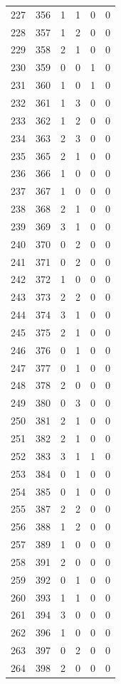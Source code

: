 \documentclass[
  letterpaper,
  DIV=11,
  numbers=noendperiod]{scrreprt}
\begin{document}
\begin{longtable}[]{@{}rrrrrr@{}}
227 & 356 & 1 & 1 & 0 & 0 \\
228 & 357 & 1 & 2 & 0 & 0 \\
229 & 358 & 2 & 1 & 0 & 0 \\
230 & 359 & 0 & 0 & 1 & 0 \\
231 & 360 & 1 & 0 & 1 & 0 \\
232 & 361 & 1 & 3 & 0 & 0 \\
233 & 362 & 1 & 2 & 0 & 0 \\
234 & 363 & 2 & 3 & 0 & 0 \\
235 & 365 & 2 & 1 & 0 & 0 \\
236 & 366 & 1 & 0 & 0 & 0 \\
237 & 367 & 1 & 0 & 0 & 0 \\
238 & 368 & 2 & 1 & 0 & 0 \\
239 & 369 & 3 & 1 & 0 & 0 \\
240 & 370 & 0 & 2 & 0 & 0 \\
241 & 371 & 0 & 2 & 0 & 0 \\
242 & 372 & 1 & 0 & 0 & 0 \\
243 & 373 & 2 & 2 & 0 & 0 \\
244 & 374 & 3 & 1 & 0 & 0 \\
245 & 375 & 2 & 1 & 0 & 0 \\
246 & 376 & 0 & 1 & 0 & 0 \\
247 & 377 & 0 & 1 & 0 & 0 \\
248 & 378 & 2 & 0 & 0 & 0 \\
249 & 380 & 0 & 3 & 0 & 0 \\
250 & 381 & 2 & 1 & 0 & 0 \\
251 & 382 & 2 & 1 & 0 & 0 \\
252 & 383 & 3 & 1 & 1 & 0 \\
253 & 384 & 0 & 1 & 0 & 0 \\
254 & 385 & 0 & 1 & 0 & 0 \\
255 & 387 & 2 & 2 & 0 & 0 \\
256 & 388 & 1 & 2 & 0 & 0 \\
257 & 389 & 1 & 0 & 0 & 0 \\
258 & 391 & 2 & 0 & 0 & 0 \\
259 & 392 & 0 & 1 & 0 & 0 \\
260 & 393 & 1 & 1 & 0 & 0 \\
261 & 394 & 3 & 0 & 0 & 0 \\
262 & 396 & 1 & 0 & 0 & 0 \\
263 & 397 & 0 & 2 & 0 & 0 \\
264 & 398 & 2 & 0 & 0 & 0 \\

\end{longtable}
\end{document}
